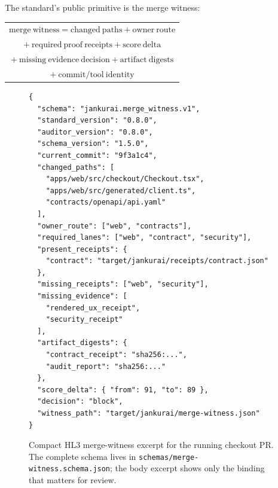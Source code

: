 The standard's public primitive is the merge witness:
\begin{center}
\small
\begin{tabular}{c}
\(\mathrm{merge\ witness}=\mathrm{changed\ paths}+\mathrm{owner\ route}\) \\
\(+\ \mathrm{required\ proof\ receipts}+\mathrm{score\ delta}\) \\
\(+\ \mathrm{missing\ evidence\ decision}+\mathrm{artifact\ digests}\) \\
\(+\ \mathrm{commit/tool\ identity}\)
\end{tabular}
\end{center}

\begin{figure}[t]
\centering
\begin{minipage}{0.92\textwidth}
\begin{lstlisting}[style=codebox]
{
  "schema": "jankurai.merge_witness.v1",
  "standard_version": "0.8.0",
  "auditor_version": "0.8.0",
  "schema_version": "1.5.0",
  "current_commit": "9f3a1c4",
  "changed_paths": [
    "apps/web/src/checkout/Checkout.tsx",
    "apps/web/src/generated/client.ts",
    "contracts/openapi/api.yaml"
  ],
  "owner_route": ["web", "contracts"],
  "required_lanes": ["web", "contract", "security"],
  "present_receipts": {
    "contract": "target/jankurai/receipts/contract.json"
  },
  "missing_receipts": ["web", "security"],
  "missing_evidence": [
    "rendered_ux_receipt",
    "security_receipt"
  ],
  "artifact_digests": {
    "contract_receipt": "sha256:...",
    "audit_report": "sha256:..."
  },
  "score_delta": { "from": 91, "to": 89 },
  "decision": "block",
  "witness_path": "target/jankurai/merge-witness.json"
}
\end{lstlisting}
\end{minipage}
\caption{Compact HL3 merge-witness excerpt for the running checkout PR. The complete schema lives in \texttt{schemas/merge-witness.schema.json}; the body excerpt shows only the binding that matters for review.}
\label{fig:merge-witness-excerpt}
\end{figure}

